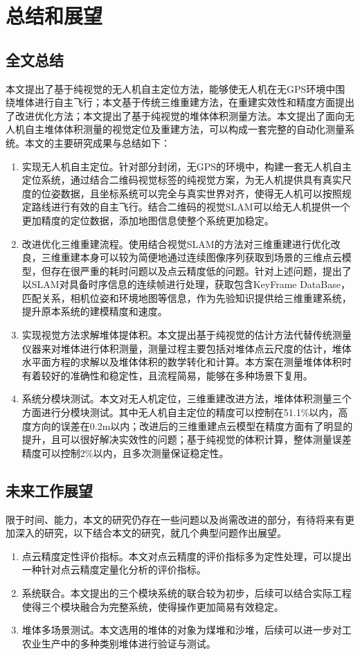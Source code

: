 \chapter{总结和展望}
\label{cha:chap6}
\section{全文总结}
\label{sec:6.1}
\label{sec:all:summary}
本文提出了基于纯视觉的无人机自主定位方法，能够使无人机在无GPS环境中围绕堆体进行自主飞行；本文基于传统三维重建方法，在重建实效性和精度方面提出了改进优化方法；本文提出了基于纯视觉的堆体体积测量方法。本文提出了面向无人机自主堆体体积测量的视觉定位及重建方法，可以构成一套完整的自动化测量系统。本文的主要研究成果与总结如下：
\begin{enumerate}
    \item 实现无人机自主定位。针对部分封闭，无GPS的环境中，构建一套无人机自主定位系统，通过结合二维码视觉标签的纯视觉方案，为无人机提供具有真实尺度的位姿数据，且坐标系统可以完全与真实世界对齐，使得无人机可以按照规定路线进行有效的自主飞行。结合二维码的视觉SLAM可以给无人机提供一个更加精度的定位数据，添加地图信息使整个系统更加稳定。
    \item 改进优化三维重建流程。使用结合视觉SLAM的方法对三维重建进行优化改良，三维重建本身可以较为简便地通过连续图像序列获取到场景的三维点云模型，但存在很严重的耗时问题以及点云精度低的问题。针对上述问题，提出了以SLAM对具备时序信息的连续帧进行处理，获取包含KeyFrame DataBase，匹配关系，相机位姿和环境地图等信息，作为先验知识提供给三维重建系统，提升原本系统的建模精度和速度。
    \item 实现视觉方法求解堆体提体积。本文提出基于纯视觉的估计方法代替传统测量仪器来对堆体进行体积测量，测量过程主要包括对堆体点云尺度的估计，堆体水平面方程的求解以及堆体体积的数学转化和计算。本方案在测量堆体体积时有着较好的准确性和稳定性，且流程简易，能够在多种场景下复用。
    \item 系统分模块测试。本文对无人机定位，三维重建改进方法，堆体体积测量三个方面进行分模块测试。其中无人机自主定位的精度可以控制在51.1$\%$以内，高度方向的误差在0.2m以内；改进后的三维重建点云模型在精度方面有了明显的提升，且可以很好解决实效性的问题；基于纯视觉的体积计算，整体测量误差精度可以控制2$\%$以内，且多次测量保证稳定性。
\end{enumerate}

\section{未来工作展望}
限于时间、能力，本文的研究仍存在一些问题以及尚需改进的部分，有待将来有更加深入的研究，以下结合本文的研究，就几个典型问题作出展望。
\begin{enumerate}
    \item 点云精度定性评价指标。本文对点云精度的评价指标多为定性处理，可以提出一种针对点云精度定量化分析的评价指标。
    \item 系统联合。本文提出的三个模块系统的联合较为初步，后续可以结合实际工程使得三个模块融合为完整系统，使得操作更加简易有效稳定。
    \item 堆体多场景测试。本文选用的堆体的对象为煤堆和沙堆，后续可以进一步对工农业生产中的多种类别堆体进行验证与测试。
    \end{enumerate}

    





   
